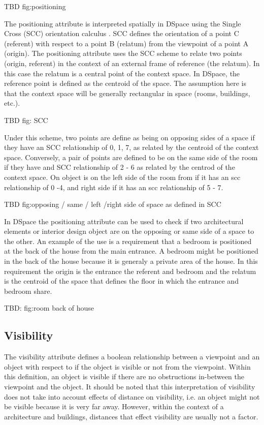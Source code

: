 \documentclass[12pt]{ucthesis}
\begin{document}
TBD fig:positioning 

The positioning attribute is interpreted spatially in DSpace using the Single Cross (SCC) orientation calculus \cite{Freksa}. SCC defines the orientation of a point C (referent) with respect to a point B (relatum) from the viewpoint of a point A (origin). The positioning attribute uses the SCC scheme to relate two points (origin, referent) in the context of an external frame of reference (the relatum). In this case the relatum is a central point of the context space. In DSpace, the reference point is defined as the centroid of the space. The assumption here is that the context space will be generally rectangular in space (rooms, buildings, etc.).

TBD fig: SCC

Under this scheme, two points are define as being on opposing sides of a space if they have an SCC relationship of 0, 1, 7, as related by the centroid of the context space. Conversely, a pair of points are defined to be on the same side of the room if they have and SCC relationship of 2 - 6 as related by the centrod of the context space. On object is on the left side of the room from if it has an scc relationship of 0 -4, and right side if it has an scc relationship of 5 - 7. 

TBD fig:opposing / same / left /right side of space as defined in SCC

In DSpace the positioning attribute can be used to check if two architectural elements or interior design object are on the opposing or same side of a space to the other. An example of the use is a requirement that a bedroom is positioned at the back of the house from the main entrance. A bedroom might be positioned in the back of the house because it is generaly a private area of the house. In this requirement the origin is the entrance the referent and bedroom and the relatum is the centroid of the space that defines the floor in which the entrance and bedroom share. 

TBD: fig:room back of house

\subsection{Visibility}
The visibility attribute defines a boolean relationship between a viewpoint and an object with respect to if the object is visible or not from the viewpoint. Within this definition, an object is visible if there are no obstructions in-between the viewpoint and the object. It should be noted that this interpretation of visibility does not take into account effects of distance on visibility, i.e. an object might not be visible because it is very far away. However, within the context of a architecture and buildings, distances that effect visibility are usually not a factor. 
\end{document}
